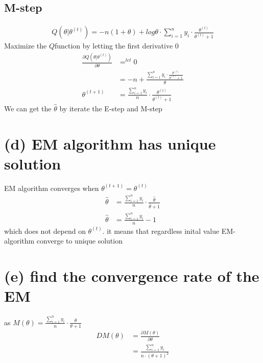\documentclass[11pt]{article}
\begin{document}
\subsection{M-step}
\begin{align*}
Q(\theta | \theta^{(t)}) = -n(1+\theta) + log\theta \cdot \sum_{i=1}^{n}y_i\cdot\frac{\theta^{(t)}}{\theta^{(t)} + 1}
\end{align*}
Maximize the $Q$function by letting the first derivative 0
\begin{align*}
\frac{\partial Q(\theta | \theta^{(t)})}{\partial \theta} &=^{let} 0\\
&=-n + \frac{\sum_{i=1}^{n}y_i\cdot\frac{\theta^{(t)}}{\theta^{(t)} + 1}}{\theta}\\
\theta^{(t+1)} &= \frac{\sum_{i=1}^{n}y_i}{n}\cdot \frac{\theta^{(t)}}{\theta^{(t)} + 1}
\end{align*}
We can get the $\hat{\theta}$ by iterate the E-step and M-step
\section*{(d) EM algorithm has unique solution}
EM algorithm converges when $\theta^{(t+1)} = \theta^{(t)}$
\begin{align*}
\hat{\theta} &= \frac{\sum_{i=1}^{n}y_i}{n}\cdot \frac{\hat{\theta}}{\hat{\theta} + 1}\\
\hat{\theta} &= \frac{\sum_{i=1}^{n}y_i}{n} - 1
\end{align*}
which does not depend on $\theta^{(t)}$. it means that regardless inital value EM-algorithm converge to unique solution
\section*{(e) find the convergence rate of the EM}
as $M(\theta) = \frac{\sum_{i=1}^{n}y_i}{n}\cdot \frac{\theta}{\theta+ 1} $
\begin{align*}
DM(\theta) &= \frac{\partial M(\theta)}{\partial \theta} \\
&= \frac{\sum_{i=1}^{n}y_i}{n\cdot (\theta + 1)^2}
\end{align*}
\end{document}
